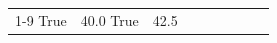 \begin{table}[H]
\begin{tabular}{lllrlllll}
\cline{1-9}
True & 40.0%
\cline{1-9}
True & 42.5%

\end{tabular}
\end{table}
